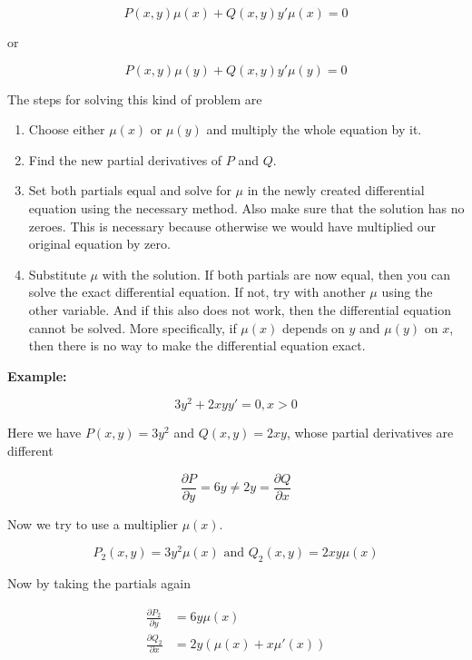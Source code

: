 \[
    P(x,y)\mu(x) + Q(x,y)y'\mu(x) = 0
\]

or

\[
    P(x,y)\mu(y) + Q(x,y)y'\mu(y) = 0
\]

The steps for solving this kind of problem are

\begin{enumerate}

    \item Choose either \(\mu(x)\) or \(\mu(y)\) and multiply the whole equation by it.

    \item Find the new partial derivatives of \(P\) and \(Q\).

    \item Set both partials equal and solve for \(\mu\) in the newly created differential equation
          using the necessary method. Also make sure that the solution has no zeroes. This is necessary
          because otherwise we would have multiplied our original equation by zero.

    \item Substitute \(\mu\) with the solution. If both partials are now equal, then you can
          solve the exact differential equation. If not, try with another \(\mu\) using the other variable.
          And if this also does not work, then the differential equation cannot be solved. More specifically,
          if \(\mu(x)\) depends on \(y\) and \(\mu(y)\) on \(x\), then there is no way to make the
          differential equation exact.

\end{enumerate}

\textbf{Example:}

\[
    3y^2 + 2xy y' = 0, x > 0
\]

Here we have \(P(x,y) = 3y^2\) and \(Q(x,y) = 2xy\), whose partial derivatives are different

\[
    \frac{\partial P}{\partial y} = 6y \ne 2y = \frac{\partial Q}{\partial x}
\]

Now we try to use a multiplier \(\mu(x)\).

\[
    P_2 (x,y) = 3y^2 \mu(x) \text{ and } Q_2 (x,y)  = 2xy\mu(x)
\]

Now by taking the partials again

\begin{align*}
    \frac{\partial P_2}{\partial y} & = 6y\mu(x)              \\
    \frac{\partial Q_2}{\partial x} & = 2y(\mu(x) + x\mu'(x))
\end{align*}

